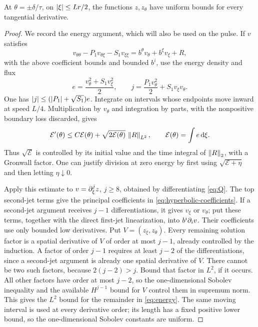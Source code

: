 

\begin{lemma}\label{lem:propagation}
At \(\theta=\pm\delta/\tau\), on \(\left\lvert\xi\right\rvert\le Lr/2\),
the functions \(z,z_\theta\) have uniform bounds for every
tangential derivative.
\end{lemma}

\begin{proof}
We record the energy argument, which will also be used on the pulse.
If \(v\) satisfies
\[
v_{\theta\theta}-P_1v_{\theta\xi}-S_1v_{\xi\xi}
=b^\theta v_\theta+b^\xi v_\xi+R,
\]
with the above coefficient bounds and bounded \(b^i\), use the energy
density and flux
\[
e=\frac{v_\theta^2+S_1v_\xi^2}{2},
\qquad
j=\frac{P_1v_\theta^2}{2}+S_1v_\xi v_\theta.
\]
One has
\(\left\lvert j\right\rvert\le(\left\lvert P_1\right\rvert+\sqrt{S_1})e\).
Integrate on intervals whose endpoints move inward at speed \(L/4\).
Multiplication by \(v_\theta\) and integration by parts, with the
nonpositive boundary loss discarded, gives
\begin{equation}\label{eq:energy}
\mathcal E'(\theta)
\le C\mathcal E(\theta)
+\sqrt{2\mathcal E(\theta)}\,\left\lVert R\right\rVert_{L^2},
\qquad \mathcal E(\theta)=\int e\,\mathrm d\xi.
\end{equation}
Thus \(\sqrt{\mathcal E}\) is controlled by its initial value and
the time integral of \(\left\lVert R\right\rVert_2\), with a Gronwall factor.
One can justify division at zero energy by first using
\(\sqrt{\mathcal E+\eta}\) and then letting \(\eta\downarrow0\).

Apply this estimate to \(v=\partial_\xi^jz\), \(j\ge8\), obtained by
differentiating \eqref{eq:Q}. The top second-jet terms give
the principal coefficients in \eqref{eq:hyperbolic-coefficients}.
If a second-jet argument receives \(j-1\) differentiations,
it gives \(v_\xi\) or \(v_\theta\); put these terms, together
with the direct first-jet linearization, into \(b^i\partial_iv\).
Their coefficients use only bounded low derivatives.
Put \(V=(z_\xi,z_\theta)\). Every remaining solution factor is
a spatial derivative of \(V\) of order at most \(j-1\),
already controlled by the induction. A factor of order \(j-1\)
requires at least \(j-2\) of the differentiations, since a
second-jet argument is already one spatial derivative of \(V\).
There cannot be two such factors, because \(2(j-2)>j\).
Bound that factor in \(L^2\), if it occurs. All other factors
have order at most \(j-2\), so the one-dimensional Sobolev
inequality and the available \(H^{j-1}\) bound for \(V\)
control them in supremum norm. This gives the \(L^2\) bound
for the remainder in \eqref{eq:energy}.
The same moving interval is used at every derivative order;
its length has a fixed positive lower bound, so the one-dimensional
Sobolev constants are uniform.


\end{proof}
